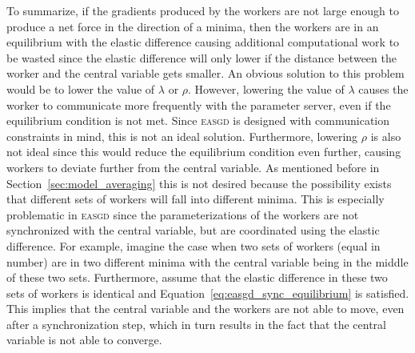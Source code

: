 To summarize, if the gradients produced by the workers are not large enough to produce a net force in the direction of a minima, then the workers are in an equilibrium with the elastic difference causing additional computational work to be wasted since the elastic difference will only lower if the distance between the worker and the central variable gets smaller. An obvious solution to this problem would be to lower the value of $\lambda$ or $\rho$. However, lowering the value of $\lambda$ causes the worker to communicate more frequently with the parameter server, even if the equilibrium condition is not met. Since \textsc{easgd} is designed with communication constraints in mind, this is not an ideal solution. Furthermore, lowering $\rho$ is also not ideal since this would reduce the equilibrium condition even further, causing workers to deviate further from the central variable. As mentioned before in Section~\ref{sec:model_averaging} this is not desired because the possibility exists that different sets of workers will fall into different minima. This is especially problematic in \textsc{easgd} since the parameterizations of the workers are not synchronized with the central variable, but are coordinated using the elastic difference. For example, imagine the case when two sets of workers (equal in number) are in two different minima with the central variable being in the middle of these two sets. Furthermore, assume that the elastic difference in these two sets of workers is identical and Equation~\ref{eq:easgd_sync_equilibrium} is satisfied. This implies that the central variable and the workers are not able to move, even after a synchronization step, which in turn results in the fact that the central variable is not able to converge.


